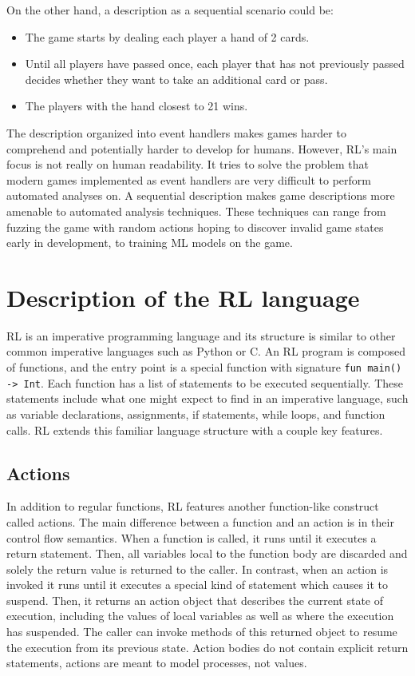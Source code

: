 On the other hand, a description as a sequential scenario could be:
\begin{itemize}
    \item The game starts by dealing each player a hand of 2 cards.
    \item Until all players have passed once, each player that has not previously passed decides whether they want to take an additional card or pass.
    \item The players with the hand closest to 21 wins.
\end{itemize}
The description organized into event handlers makes games harder to comprehend and potentially harder to develop for humans.
However, RL's main focus is not really on human readability.
It tries to solve the problem that modern games implemented as event handlers are very difficult to perform automated analyses on.
A sequential description makes game descriptions more amenable to automated analysis techniques.
These techniques can range from fuzzing the game with random actions hoping to discover invalid game states early in development, to training ML models on the game.

\section{Description of the RL language}
RL is an imperative programming language and its structure is similar to other common imperative
languages such as Python or C. An RL program is composed of functions, and the entry point is a special
function with signature \texttt{fun main() -> Int}. Each function has a list of statements to be executed sequentially.
These statements include what one might expect to find in an imperative language, such as 
variable declarations, assignments, if statements, while loops, and function calls. RL extends this 
familiar language structure with a couple key features.

\subsection{Actions}
In addition to regular functions, RL features another function-like construct called actions.
The main difference between a function and an action is in their control flow semantics.
When a function is called, it runs until it executes a return statement.
Then, all variables local to the function body are discarded and solely the return value is returned to the caller.
In contrast, when an action is invoked it runs until it executes a special kind of statement which causes it to suspend.
Then, it returns an action object that describes the current state of execution, including the values of local variables as well as where the execution has suspended.
The caller can invoke methods of this returned object to resume the execution from its previous state.
Action bodies do not contain explicit return statements, actions are meant to model processes, not values.

